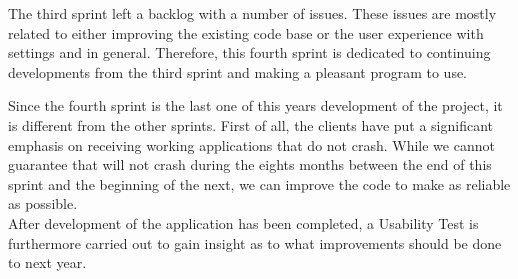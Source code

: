The third sprint left a backlog with a number of issues.
These issues are mostly related to either improving the existing code base or the user experience with settings and \launcher in general.
Therefore, this fourth sprint is dedicated to continuing developments from the third sprint and making \launcher a pleasant program to use.

Since the fourth sprint is the last one of this years development of the project, it is different from the other sprints.
First of all, the clients have put a significant emphasis on receiving working applications that do not crash.
While we cannot guarantee that \launcher will not crash during the eights months between the end of this sprint and the beginning of the next, we can improve the code to make \launcher as reliable as possible.\\

After development of the application has been completed, a Usability Test is furthermore carried out to gain insight as to what improvements should be done to \launcher next year.